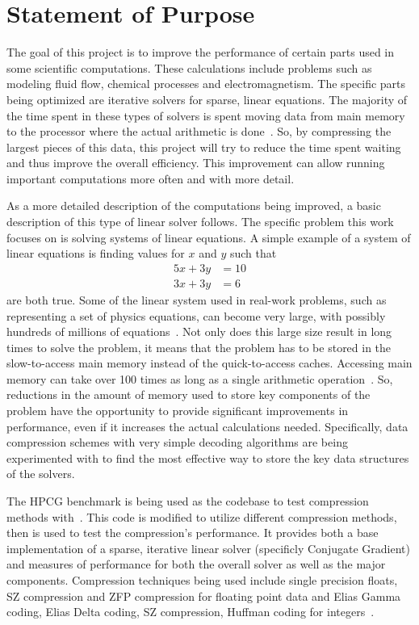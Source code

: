 \documentclass[titlepage]{article}
\begin{document}
\section{Statement of Purpose}
The goal of this project is to improve the performance of certain parts
used in some scientific computations.
These calculations include problems such as modeling fluid flow, chemical processes and electromagnetism.
The specific parts being optimized are iterative solvers for sparse, linear equations.
The majority of the time spent in these types of solvers is spent moving data from main memory
to the processor where the actual arithmetic is done~\cite{Lawlor:2013:compression}.
So, by compressing the largest pieces of this data, this project will try to reduce the time spent waiting and thus improve the overall efficiency.
This improvement can allow running important computations more often and with more detail.

As a more detailed description of the computations being improved, a basic description of
this type of linear solver follows.
The specific problem this work focuses on is solving systems of linear equations.
A simple example of a system of linear equations is finding values for \(x\) and \(y\) such that
\begin{align*}
	5x + 3y &= 10\\
	3x + 3y &= 6
\end{align*}
are both true.
Some of the linear system used in real-work problems, such as representing a set of physics equations,
can become very large, with possibly hundreds of millions of equations~\cite{Davis:2011:FloridaMatrixCollection}.
Not only does this large size result in long times to solve the problem,
it means that the problem has to be stored in the slow-to-access main memory instead of the quick-to-access caches.
Accessing main memory can take over 100 times as long as a single arithmetic operation~\cite{Goumas:2009:performanceEval}.
So, reductions in the amount of memory used to store key components of the problem
have the opportunity to provide significant improvements in performance, even if it increases the actual calculations needed.
Specifically, data compression schemes with very simple decoding algorithms are being experimented with
to find the most effective way to store the key data structures of the solvers.

The HPCG benchmark is being used as the codebase to test compression methods with~\cite{Dongarra:2015:HPCG}.
This code is modified to utilize different compression methods, then is used to test the compression's performance.
It provides both a base implementation of a sparse, iterative linear solver (specificly Conjugate Gradient)
and measures of performance for both the overall solver as well as the major components.
Compression techniques being used include single precision floats, SZ compression and ZFP compression for floating point data
and Elias Gamma coding, Elias Delta coding, SZ compression, Huffman coding for integers~\cite{Di:2016:SZ,Lindstrom:2014:zfp,Elias:1975:codeword,Huffman:1952:coding}.
\end{document}
